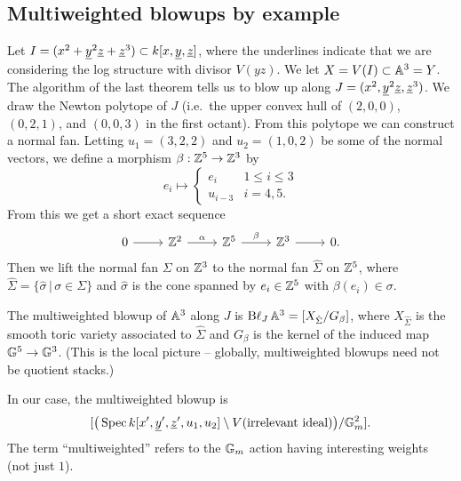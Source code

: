 \documentclass{amsart}
\begin{document}
\subsection{Multiweighted blowups by example}

\begin{ex}
	Let $I = (x^2 + \ul{y}^2 \ul{z} + \ul{z}^3) \subset k[x, \ul{y}, \ul{z}]$, where the underlines indicate that we are considering the log structure with divisor $V(yz)$.
	We let $X = V(I) \subset \AA^3 = Y$.
	The algorithm of the last theorem tells us to blow up along $J = (x^2 , \ul{y}^2 \ul{z}, \ul{z}^3)$.
	We draw the Newton polytope of $J$ (i.e.\ the upper convex hull of $(2, 0, 0)$, $(0, 2, 1)$, and $(0, 0, 3)$ in the first octant).
	From this polytope we can construct a normal fan.
	Letting $u_1 = (3, 2, 2)$ and $u_2 = (1, 0, 2)$ be some of the normal vectors, we define a morphism $\beta: \ZZ^5 \to \ZZ^3$ by
	\[
		e_i \mapsto \begin{cases}
			e_i & 1 \leq i \leq 3 \\
			u_{i-3} & i = 4, 5.
		\end{cases}
	\]
	From this we get a short exact sequence
	\[
		\begin{tikzcd}
			0 \rar & \ZZ^2 \rar["\alpha"] & \ZZ^5 \rar["\beta"] & \ZZ^3 \rar & 0.
		\end{tikzcd}
	\]
	Then we lift the normal fan $\Sigma$ on $\ZZ^3$ to the normal fan $\hat{\Sigma}$ on $\ZZ^5$, where $\hat{\Sigma} = \{ \hat{\sigma} \,|\, \sigma \in \Sigma\}$ and $\hat{\sigma}$ is the cone spanned by $e_i \in \ZZ^5$ with $\beta(e_i) \in \sigma$.
	
	The multiweighted blowup of $\AA^3$ along $J$ is $\Bl_J \AA^3 = [X_{\hat{\Sigma}} / G_\beta]$, where $X_{\hat{\Sigma}}$ is the smooth toric variety associated to $\hat{\Sigma}$ and $G_\beta$ is the kernel of the induced map $\GG^5 \to \GG^3$.
	(This is the local picture -- globally, multiweighted blowups need not be quotient stacks.)

	In our case, the multiweighted blowup is
	\[
		[\big(\Spec k[x', \ul{y}', \ul{z}', u_1, u_2] \setminus V(\textrm{irrelevant ideal})\big) / \GG_m^2].
	\]
	The term ``multiweighted'' refers to the $\GG_m$ action having interesting weights (not just $1$).
\end{ex}
\end{document}
